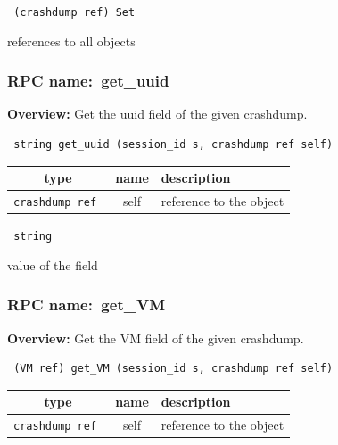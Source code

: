 {\tt 
(crashdump ref) Set
}


references to all objects
\vspace{0.3cm}
\vspace{0.3cm}
\vspace{0.3cm}
\subsubsection{RPC name:~get\_uuid}

{\bf Overview:} 
Get the uuid field of the given crashdump.

\begin{verbatim} string get_uuid (session_id s, crashdump ref self)\end{verbatim}



 
\vspace{0.3cm}
\begin{tabular}{|c|c|p{7cm}|}
 \hline
{\bf type} & {\bf name} & {\bf description} \\ \hline
{\tt crashdump ref } & self & reference to the object \\ \hline 

\end{tabular}

\vspace{0.3cm}

{\tt 
string
}


value of the field
\vspace{0.3cm}
\vspace{0.3cm}
\vspace{0.3cm}
\subsubsection{RPC name:~get\_VM}

{\bf Overview:} 
Get the VM field of the given crashdump.

\begin{verbatim} (VM ref) get_VM (session_id s, crashdump ref self)\end{verbatim}



 
\vspace{0.3cm}
\begin{tabular}{|c|c|p{7cm}|}
 \hline
{\bf type} & {\bf name} & {\bf description} \\ \hline
{\tt crashdump ref } & self & reference to the object \\ \hline 

\end{tabular}

